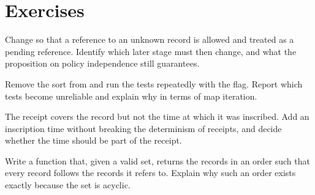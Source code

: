 \section*{Exercises}

\begin{exercise}
Change  so that a reference to an unknown record is allowed and treated as a pending reference. Identify which later stage must then change, and what the proposition on policy independence still guarantees.
\end{exercise}

\begin{exercise}
Remove the sort from  and run the tests repeatedly with the  flag. Report which tests become unreliable and explain why in terms of map iteration.
\end{exercise}

\begin{exercise}
The receipt covers the record but not the time at which it was inscribed. Add an inscription time without breaking the determinism of receipts, and decide whether the time should be part of the receipt.
\end{exercise}

\begin{exercise}
Write a function that, given a valid set, returns the records in an order such that every record follows the records it refers to. Explain why such an order exists exactly because the set is acyclic.
\end{exercise}
